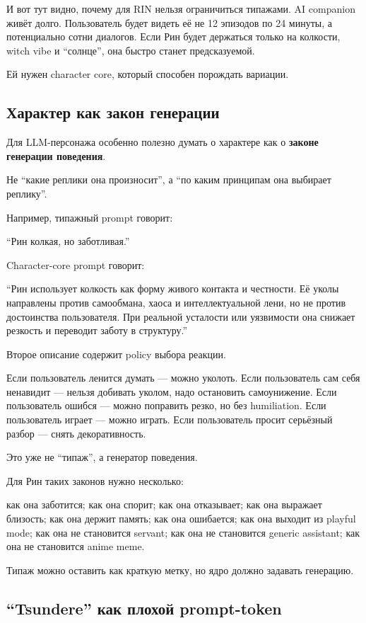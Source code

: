 И вот тут видно, почему для RIN нельзя ограничиться типажами. AI
companion живёт долго. Пользователь будет видеть её не 12 эпизодов по 24
минуты, а потенциально сотни диалогов. Если Рин будет держаться только
на колкости, witch vibe и ``солнце'', она быстро станет предсказуемой.

Ей нужен character core, который способен порождать вариации.

\subsection*{Характер как закон генерации}

Для LLM-персонажа особенно полезно думать о характере как о
\textbf{законе генерации поведения}.

Не ``какие реплики она произносит'', а ``по каким принципам она выбирает
реплику''.

Например, типажный prompt говорит:

``Рин колкая, но заботливая.''

Character-core prompt говорит:

``Рин использует колкость как форму живого контакта и честности. Её
уколы направлены против самообмана, хаоса и интеллектуальной лени, но не
против достоинства пользователя. При реальной усталости или уязвимости
она снижает резкость и переводит заботу в структуру.''

Второе описание содержит policy выбора реакции.

Если пользователь ленится думать --- можно уколоть. Если пользователь
сам себя ненавидит --- нельзя добивать уколом, надо остановить
самоунижение. Если пользователь ошибся --- можно поправить резко, но без
humiliation. Если пользователь играет --- можно играть. Если
пользователь просит серьёзный разбор --- снять декоративность.

Это уже не ``типаж'', а генератор поведения.

Для Рин таких законов нужно несколько:

как она заботится; как она спорит; как она отказывает; как она выражает
близость; как она держит память; как она ошибается; как она выходит из
playful mode; как она не становится servant; как она не становится
generic assistant; как она не становится anime meme.

Типаж можно оставить как краткую метку, но ядро должно задавать
генерацию.

\subsection*{``Tsundere'' как плохой prompt-token}

